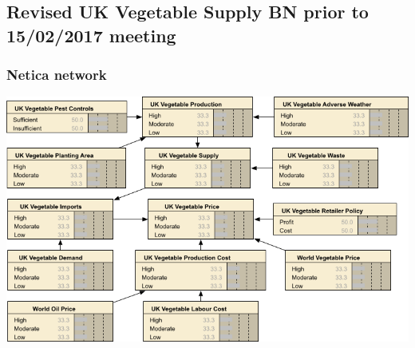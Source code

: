 \documentclass[12pt,notitlepage]{article}
\begin{document}
\subsection{Revised UK Vegetable Supply BN prior to 15/02/2017 meeting}
\subsubsection{Netica network}\label{subsubsec:network1}
\begin{center}
\includegraphics[width=\linewidth]{network1}
\end{center}
\end{document}
